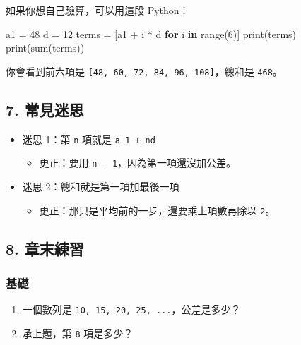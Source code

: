 \documentclass[
  chinese,
  12pt,
  a4paper,
  oneside]{article}
\newenvironment{Shaded}{}{}
\newcommand{\BuiltInTok}[1]{\textcolor[rgb]{0.00,0.50,0.00}{#1}}
\newcommand{\ControlFlowTok}[1]{\textcolor[rgb]{0.00,0.44,0.13}{\textbf{#1}}}
\newcommand{\DecValTok}[1]{\textcolor[rgb]{0.25,0.63,0.44}{#1}}
\newcommand{\KeywordTok}[1]{\textcolor[rgb]{0.00,0.44,0.13}{\textbf{#1}}}
\newcommand{\NormalTok}[1]{#1}
\newcommand{\OperatorTok}[1]{\textcolor[rgb]{0.40,0.40,0.40}{#1}}
\providecommand{\tightlist}{%
  \setlength{\itemsep}{0pt}\setlength{\parskip}{0pt}}
\begin{document}
如果你想自己驗算，可以用這段 Python：

\begin{Shaded}
\begin{Highlighting}[]
\NormalTok{a1 }\OperatorTok{=} \DecValTok{48}
\NormalTok{d }\OperatorTok{=} \DecValTok{12}
\NormalTok{terms }\OperatorTok{=}\NormalTok{ [a1 }\OperatorTok{+}\NormalTok{ i }\OperatorTok{*}\NormalTok{ d }\ControlFlowTok{for}\NormalTok{ i }\KeywordTok{in} \BuiltInTok{range}\NormalTok{(}\DecValTok{6}\NormalTok{)]}
\BuiltInTok{print}\NormalTok{(terms)}
\BuiltInTok{print}\NormalTok{(}\BuiltInTok{sum}\NormalTok{(terms))}
\end{Highlighting}
\end{Shaded}

你會看到前六項是 \texttt{{[}48,\ 60,\ 72,\ 84,\ 96,\ 108{]}}，總和是
\texttt{468}。

\subsection{7. 常見迷思}\label{ux5e38ux898bux8ff7ux601d}

\begin{itemize}
\tightlist
\item
  迷思 1：第 \texttt{n} 項就是 \texttt{a\_1\ +\ nd}

  \begin{itemize}
  \tightlist
  \item
    更正：要用 \texttt{n\ -\ 1}，因為第一項還沒加公差。
  \end{itemize}
\item
  迷思 2：總和就是第一項加最後一項

  \begin{itemize}
  \tightlist
  \item
    更正：那只是平均前的一步，還要乘上項數再除以 \texttt{2}。
  \end{itemize}
\end{itemize}

\subsection{8. 章末練習}\label{ux7ae0ux672bux7df4ux7fd2}

\subsubsection{基礎}\label{ux57faux790e}

\begin{enumerate}
\def\labelenumi{\arabic{enumi}.}
\tightlist
\item
  一個數列是 \texttt{10,\ 15,\ 20,\ 25,\ ...}，公差是多少？
\item
  承上題，第 \texttt{8} 項是多少？
\end{enumerate}
\end{document}
